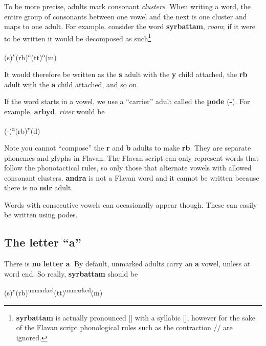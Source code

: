 \documentclass[10pt,oneside]{memoir}
\newcommand{\ipa}[1]{/\textipa{#1}/}
\newcommand{\apa}[1]{[\textipa{#1}]}
\begin{document}
To be more precise, adults mark consonant \emph{clusters}. When writing a word, the entire group of consonants between one vowel and the next is one cluster and maps to one adult. For example, consider the word \textbf{syrbattam}, \emph{room}; if it were to be written it would be decomposed as such\footnote{\textbf{syrbattam} is actually pronounced \apa{s\s{r}"bat:am} with a syllabic \apa{r}, however for the sake of the Flavan script phonological rules such as the contraction \ipa{1r} \textrightarrow \apa{\s{r}} are ignored.}

\begin{center}
    \Large (s)\textsuperscript{y}(rb)\textsuperscript{a}(tt)\textsuperscript{a}(m)
\end{center}

It would therefore be written as the \textbf{s} adult with the \textbf{y} child attached, the \textbf{rb} adult with the \textbf{a} child attached, and so on.

If the word starts in a vowel, we use a ``carrier'' adult called the \textbf{pode} (\textbf{-}). For example, \textbf{arbyd}, \emph{river} would be

\begin{center}
    \LARGE (-)\textsuperscript{a}(rb)\textsuperscript{y}(d)
\end{center}

Note you cannot ``compose'' the \textbf{r} and \textbf{b} adults to make \textbf{rb}. They are separate phonemes and glyphs in Flavan. The Flavan script can only represent words that follow the phonotactical rules, so only those that alternate vowels with allowed consonant clusters. \textbf{andra} is not a Flavan word and it cannot be written because there is no \textbf{ndr} adult.

Words with consecutive vowels can occasionally appear though. These can easily be written using podes.

\subsection{The letter ``a''}

There is \textbf{no letter a}. By default, unmarked adults carry an \textbf{a} vowel, unless at word end. So really, \textbf{syrbattam} should be

\begin{center}
    \Large (s)\textsuperscript{y}(rb)\textsuperscript{unmarked}(tt)\textsuperscript{unmarked}(m)
\end{center}
\end{document}
